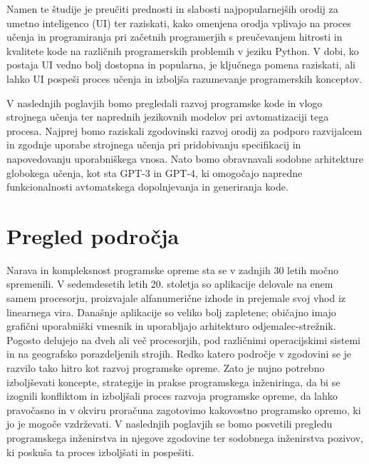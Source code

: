 \documentclass[a4paper,12pt,openright]{book}
\begin{document}
Namen te študije je preučiti prednosti in slabosti najpopularnejših orodij za umetno inteligenco (UI) ter raziskati, kako omenjena orodja vplivajo na proces učenja in programiranja pri začetnih programerjih s preučevanjem hitrosti in kvalitete kode na različnih programerskih problemih v jeziku Python. V dobi, ko postaja UI vedno bolj dostopna in popularna, je ključnega pomena raziskati, ali lahko UI pospeši proces učenja in izboljša razumevanje programerskih konceptov.  

V naslednjih poglavjih bomo pregledali razvoj programske kode in vlogo strojnega učenja ter naprednih jezikovnih modelov pri avtomatizaciji tega procesa. Najprej bomo raziskali zgodovinski razvoj orodij za podporo razvijalcem in zgodnje uporabe strojnega učenja pri pridobivanju specifikacij in napovedovanju uporabniškega vnosa. Nato bomo obravnavali sodobne arhitekture globokega učenja, kot sta GPT-3 in GPT-4, ki omogočajo napredne funkcionalnosti avtomatskega dopolnjevanja in generiranja kode.



\chapter{Pregled področja}
Narava in kompleksnost programske opreme sta se v zadnjih 30 letih močno spremenili. V sedemdesetih letih 20. stoletja so aplikacije delovale na enem samem procesorju, proizvajale alfanumerične izhode in prejemale svoj vhod iz linearnega vira. Današnje aplikacije so veliko bolj zapletene; običajno imajo grafični uporabniški vmesnik in uporabljajo arhitekturo odjemalec-strežnik. Pogosto delujejo na dveh ali več procesorjih, pod različnimi operacijskimi sistemi in na geografsko porazdeljenih strojih. Redko katero področje v zgodovini se je  razvilo tako hitro kot razvoj programske opreme. Zato je nujno potrebno izboljševati koncepte, strategije in prakse programskega inženiringa, da bi se izognili konfliktom in izboljšali proces razvoja programske opreme, da lahko pravočasno in v okviru proračuna zagotovimo kakovostno programsko opremo, ki jo je mogoče vzdrževati.
V naslednjih poglavjih se bomo posvetili pregledu programskega inženirstva in njegove zgodovine ter sodobnega inženirstva pozivov, ki poskuša ta proces izboljšati in pospešiti.

\cite{aggarwal2005software}
\end{document}
